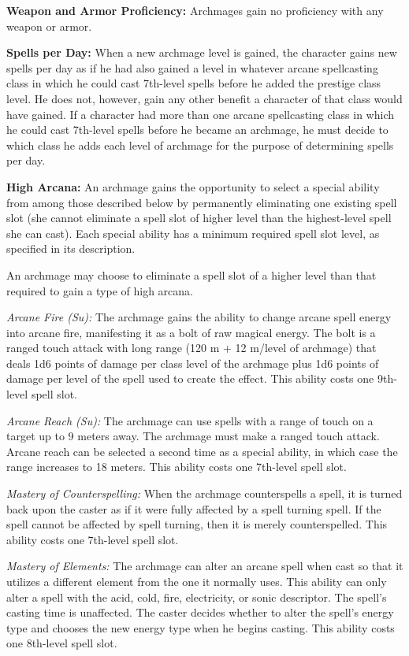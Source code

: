 {
\textbf{Weapon and Armor Proficiency:} Archmages gain no proficiency with any weapon or armor.

\textbf{Spells per Day:} When a new archmage level is gained, the character gains new spells per day as if he had also gained a level in whatever arcane spellcasting class in which he could cast 7th-level spells before he added the prestige class level. He does not, however, gain any other benefit a character of that class would have gained. If a character had more than one arcane spellcasting class in which he could cast 7th-level spells before he became an archmage, he must decide to which class he adds each level of archmage for the purpose of determining spells per day.

\textbf{High Arcana:} An archmage gains the opportunity to select a special ability from among those described below by permanently eliminating one existing spell slot (she cannot eliminate a spell slot of higher level than the highest-level spell she can cast). Each special ability has a minimum required spell slot level, as specified in its description.

An archmage may choose to eliminate a spell slot of a higher level than that required to gain a type of high arcana.

\textit{Arcane Fire (Su):} The archmage gains the ability to change arcane spell energy into arcane fire, manifesting it as a bolt of raw magical energy. The bolt is a ranged touch attack with long range (120 m + 12 m/level of archmage) that deals 1d6 points of damage per class level of the archmage plus 1d6 points of damage per level of the spell used to create the effect. This ability costs one 9th-level spell slot.

\textit{Arcane Reach (Su):} The archmage can use spells with a range of touch on a target up to 9 meters away. The archmage must make a ranged touch attack. Arcane reach can be selected a second time as a special ability, in which case the range increases to 18 meters. This ability costs one 7th-level spell slot.

\textit{Mastery of Counterspelling:} When the archmage counterspells a spell, it is turned back upon the caster as if it were fully affected by a spell turning spell. If the spell cannot be affected by spell turning, then it is merely counterspelled. This ability costs one 7th-level spell slot.

\textit{Mastery of Elements:} The archmage can alter an arcane spell when cast so that it utilizes a different element from the one it normally uses. This ability can only alter a spell with the acid, cold, fire, electricity, or sonic descriptor. The spell's casting time is unaffected. The caster decides whether to alter the spell's energy type and chooses the new energy type when he begins casting. This ability costs one 8th-level spell slot.

}
